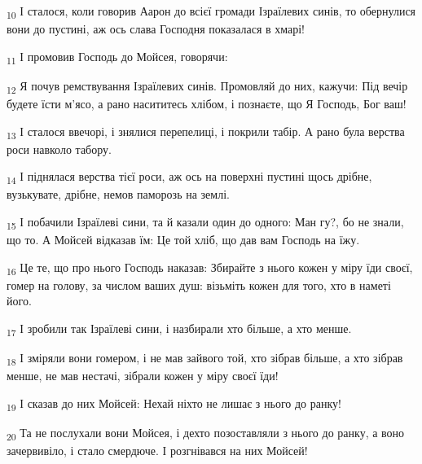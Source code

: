 \begin{tcolorbox}
\textsubscript{10} І сталося, коли говорив Аарон до всієї громади Ізраїлевих синів, то обернулися вони до пустині, аж ось слава Господня показалася в хмарі!
\end{tcolorbox}
\begin{tcolorbox}
\textsubscript{11} І промовив Господь до Мойсея, говорячи:
\end{tcolorbox}
\begin{tcolorbox}
\textsubscript{12} Я почув ремствування Ізраїлевих синів. Промовляй до них, кажучи: Під вечір будете їсти м'ясо, а рано насититесь хлібом, і познаєте, що Я Господь, Бог ваш!
\end{tcolorbox}
\begin{tcolorbox}
\textsubscript{13} І сталося ввечорі, і знялися перепелиці, і покрили табір. А рано була верства роси навколо табору.
\end{tcolorbox}
\begin{tcolorbox}
\textsubscript{14} І піднялася верства тієї роси, аж ось на поверхні пустині щось дрібне, вузькувате, дрібне, немов паморозь на землі.
\end{tcolorbox}
\begin{tcolorbox}
\textsubscript{15} І побачили Ізраїлеві сини, та й казали один до одного: Ман гу?, бо не знали, що то. А Мойсей відказав їм: Це той хліб, що дав вам Господь на їжу.
\end{tcolorbox}
\begin{tcolorbox}
\textsubscript{16} Це те, що про нього Господь наказав: Збирайте з нього кожен у міру їди своєї, гомер на голову, за числом ваших душ: візьміть кожен для того, хто в наметі його.
\end{tcolorbox}
\begin{tcolorbox}
\textsubscript{17} І зробили так Ізраїлеві сини, і назбирали хто більше, а хто менше.
\end{tcolorbox}
\begin{tcolorbox}
\textsubscript{18} І зміряли вони гомером, і не мав зайвого той, хто зібрав більше, а хто зібрав менше, не мав нестачі, зібрали кожен у міру своєї їди!
\end{tcolorbox}
\begin{tcolorbox}
\textsubscript{19} І сказав до них Мойсей: Нехай ніхто не лишає з нього до ранку!
\end{tcolorbox}
\begin{tcolorbox}
\textsubscript{20} Та не послухали вони Мойсея, і дехто позоставляли з нього до ранку, а воно зачервивіло, і стало смердюче. І розгнівався на них Мойсей!
\end{tcolorbox}
